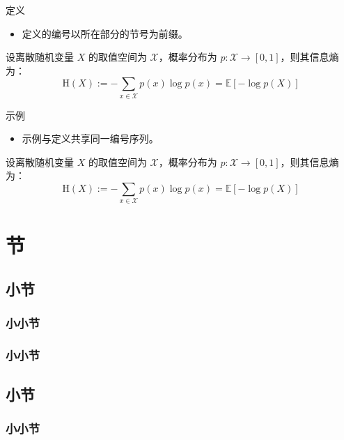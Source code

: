 \documentclass[
11pt,notheorems,hyperref={pdfauthor=whatever},aspectratio=169
]{beamer}
\begin{document}
\begin{frame}{}{定义}
    \begin{itemize}
        \item 定义的编号以所在部分的节号为前缀。
    \end{itemize}
    \begin{definition}[示例定义]
        设离散随机变量 $X$ 的取值空间为 $\mathcal{X}$，概率分布为 $p:{\mathcal{X}}\to[0,1]$，则其信息熵为：
        \begin{equation}
            \mathrm{H}(X) := -\sum_{x\in\mathcal{X}} p(x)\log p(x) = \mathbb{E}[-\log p(X)]
        \end{equation}
    \end{definition}
\end{frame}

\begin{frame}{}{示例}
    \begin{itemize}
        \item 示例与定义共享同一编号序列。
    \end{itemize}
    \begin{examp}[示例]
        设离散随机变量 $X$ 的取值空间为 $\mathcal{X}$，概率分布为 $p:{\mathcal{X}}\to[0,1]$，则其信息熵为：
        \begin{equation}
            \mathrm{H}(X) := -\sum_{x\in\mathcal{X}} p(x)\log p(x) = \mathbb{E}[-\log p(X)]
        \end{equation}
    \end{examp}
\end{frame}


\section{节}
\subsection{小节}
\subsubsection{小小节}
\subsubsection{小小节}
\subsection{小节}
\subsubsection{小小节}
\end{document}
